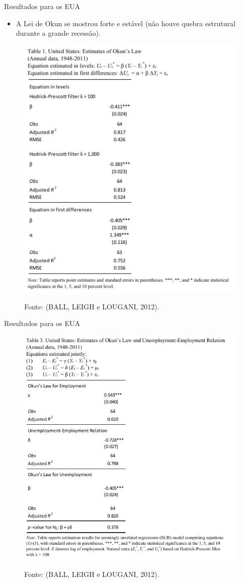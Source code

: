 \documentclass[11pt]{beamer}
\begin{document}
\begin{frame}{Resultados para os EUA}

\begin{itemize}
    \item A Lei de Okun se mostrou forte e estável (não houve quebra estrutural durante a grande recessão).
\end{itemize}

\begin{figure}[H]
	\centering
	\label{fig:tabela_1}
	\includegraphics[height = 0.65\textheight, width=0.65\linewidth]{"Figuras/tabela_1.jpeg"} \\
\caption*{\small Fonte: (BALL, LEIGH e LOUGANI, 2012).}
\end{figure}

\end{frame}

\begin{frame}{Resultados para os EUA}

\begin{figure}[H]
	\centering
	\label{fig:tabela_3}
	\includegraphics[height = 0.65\textheight, width=0.65\linewidth]{"Figuras/tabela_3.jpeg"} \\
\caption*{\small Fonte: (BALL, LEIGH e LOUGANI, 2012).}
\end{figure}

\end{frame}
\end{document}
